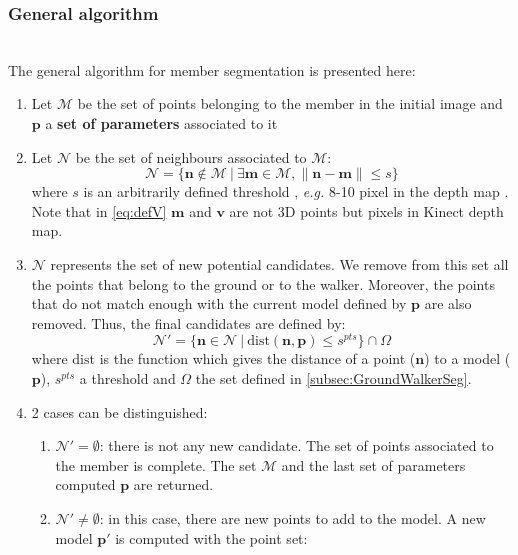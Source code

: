\documentclass[letterpaper, 10 pt, conference]{ieeeconf}
\newcommand{\CDOK}[2]{{#1}} %
\begin{document}
\subsubsection{General algorithm}~\\
\label{subsub:generalAlgo}
The general algorithm for member segmentation is presented here:
\begin{enumerate}
	\item Let $\mathcal{M}$ be the set of points belonging to the member in the initial image and $\mathbf{p}$ a \textbf{set of parameters} associated to it
	\item Let $\mathcal{N}$ be the set of neighbours associated to $\mathcal{M}$:
	\begin{equation}
		\mathcal{N} = \{\mathbf{n}\notin\mathcal{M}\ |\ \exists \mathbf{m}\in\mathcal{M}, \|\mathbf{n} - \mathbf{m}\| \leq s \}
		\label{eq:defV}
	\end{equation}
	where $s$ is an arbitrarily defined threshold \CDOK{, \textit{e.g.} 8-10 pixel in the depth map }{to define (8-10 pixels)}. Note that in \eqref{eq:defV} $\mathbf{m}$ and $\mathbf{v}$ are not 3D points but pixels in Kinect \CDOK{depth map}{image}.
	\item $\mathcal{N}$ represents the set of new potential candidates. We remove from this set all the points that belong to the ground or to the walker. Moreover, the points that do not match enough with the current model defined by $\mathbf{p}$ are also removed. Thus, the final candidates are defined by:
	\begin{equation}
		\mathcal{N}' = \{\mathbf{n}\in\mathcal{N}\ |\ \mathrm{dist(\mathbf{n},\mathbf{p})}\leq s^{pts}\}\cap\Omega
	\end{equation}
	where $\mathrm{dist}$ is the function which gives the distance of a point ($\mathbf{n}$) to a model ($\mathbf{p}$), $s^{pts}$ a threshold and $\Omega$ the set defined in \ref{subsec:GroundWalkerSeg}.
	\item 2 cases can be distinguished:
	\begin{enumerate}
		\item $\mathcal{N}'=\emptyset$: there is not any new candidate. The set of points associated to the member is complete. The set $\mathcal{M}$ and the last set of parameters computed $\mathbf{p}$ are returned.
		\item $\mathcal{N}'\neq\emptyset$: in this case, there are new points to add to the model. A new model $\mathbf{p'}$ is computed with the point set:
		\begin{equation}

\end{equation}
\end{enumerate}
\end{enumerate}
\end{document}
